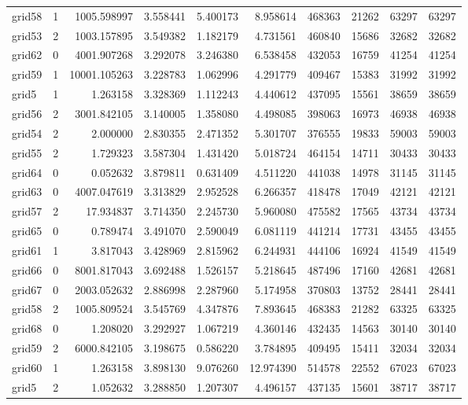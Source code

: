 \begin{longtable}{|l|r|r|r|r|r|r|r|r|r|}
grid58 & 1 & 1005.598997 & 3.558441 & 5.400173 & 8.958614 & 468363 & 21262 & 63297 & 63297 \\
grid53 & 2 & 1003.157895 & 3.549382 & 1.182179 & 4.731561 & 460840 & 15686 & 32682 & 32682 \\
grid62 & 0 & 4001.907268 & 3.292078 & 3.246380 & 6.538458 & 432053 & 16759 & 41254 & 41254 \\
grid59 & 1 & 10001.105263 & 3.228783 & 1.062996 & 4.291779 & 409467 & 15383 & 31992 & 31992 \\
grid5 & 1 & 1.263158 & 3.328369 & 1.112243 & 4.440612 & 437095 & 15561 & 38659 & 38659 \\
grid56 & 2 & 3001.842105 & 3.140005 & 1.358080 & 4.498085 & 398063 & 16973 & 46938 & 46938 \\
grid54 & 2 & 2.000000 & 2.830355 & 2.471352 & 5.301707 & 376555 & 19833 & 59003 & 59003 \\
grid55 & 2 & 1.729323 & 3.587304 & 1.431420 & 5.018724 & 464154 & 14711 & 30433 & 30433 \\
grid64 & 0 & 0.052632 & 3.879811 & 0.631409 & 4.511220 & 441038 & 14978 & 31145 & 31145 \\
grid63 & 0 & 4007.047619 & 3.313829 & 2.952528 & 6.266357 & 418478 & 17049 & 42121 & 42121 \\
grid57 & 2 & 17.934837 & 3.714350 & 2.245730 & 5.960080 & 475582 & 17565 & 43734 & 43734 \\
grid65 & 0 & 0.789474 & 3.491070 & 2.590049 & 6.081119 & 441214 & 17731 & 43455 & 43455 \\
grid61 & 1 & 3.817043 & 3.428969 & 2.815962 & 6.244931 & 444106 & 16924 & 41549 & 41549 \\
grid66 & 0 & 8001.817043 & 3.692488 & 1.526157 & 5.218645 & 487496 & 17160 & 42681 & 42681 \\
grid67 & 0 & 2003.052632 & 2.886998 & 2.287960 & 5.174958 & 370803 & 13752 & 28441 & 28441 \\
grid58 & 2 & 1005.809524 & 3.545769 & 4.347876 & 7.893645 & 468383 & 21282 & 63325 & 63325 \\
grid68 & 0 & 1.208020 & 3.292927 & 1.067219 & 4.360146 & 432435 & 14563 & 30140 & 30140 \\
grid59 & 2 & 6000.842105 & 3.198675 & 0.586220 & 3.784895 & 409495 & 15411 & 32034 & 32034 \\
grid60 & 1 & 1.263158 & 3.898130 & 9.076260 & 12.974390 & 514578 & 22552 & 67023 & 67023 \\
grid5 & 2 & 1.052632 & 3.288850 & 1.207307 & 4.496157 & 437135 & 15601 & 38717 & 38717 \\

\end{longtable}
